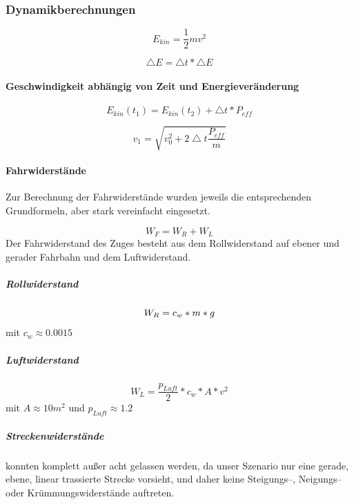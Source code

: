 \documentclass[10pt,a4paper]{article}
\begin{document}
\subsubsection{Dynamikberechnungen}
\begin{equation}
E_{kin} = \frac{1}{2} m v^{2} 
\end{equation}

\begin{equation}
\bigtriangleup E = \bigtriangleup t \ast \bigtriangleup E
\end{equation}

\paragraph{Geschwindigkeit abhängig von Zeit und Energieveränderung}
\begin{equation}
E_{kin}(t_{1}) = E_{kin}(t_{2}) + \bigtriangleup t \ast P_{eff}
\end{equation}

\begin{equation}
v_{1} = \sqrt{v_{0}^2 + 2 \bigtriangleup t \frac{P_{eff}}{m}}
\end{equation}

\paragraph{Fahrwiderstände}

Zur Berechnung der Fahrwiderstände wurden jeweils die entsprechenden Grundformeln, aber stark vereinfacht eingesetzt.

\begin{equation}
W_F = W_R + W_L
\end{equation}
Der Fahrwiderstand des Zuges besteht aus dem Rollwiderstand auf ebener und gerader Fahrbahn und dem Luftwiderstand.
\subparagraph{Rollwiderstand}
\begin{equation}
W_R = c_w \ast m * g \\
\end{equation}
mit $ c_w \approx 0.0015 $
\subparagraph{Luftwiderstand}
\begin{equation}
W_L = \frac{p_{Luft}}{2} * c_w * A * v^2
\end{equation}
mit $ A \approx 10 m^2 $ und $ p_{Luft} \approx 1.2 $

\subparagraph{Streckenwiderstände} konnten komplett außer acht gelassen werden, da unser Szenario nur eine gerade, ebene, linear trassierte Strecke vorsieht, und daher keine Steigungs--, Neigungs-- oder Krümmungswiderstände auftreten.
\end{document}
